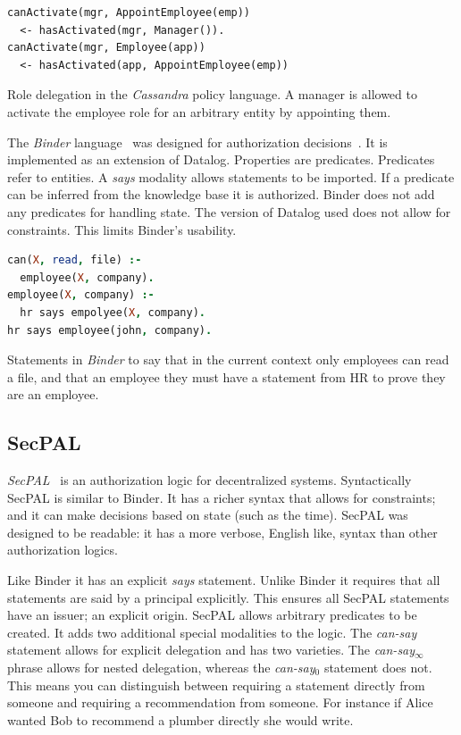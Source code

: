 \documentclass[a4paper,sfsidenotes]{%
  article%
}
\begin{document}
\begin{marginfigure}
  \begin{lstlisting}[language=Cassandra]
canActivate(mgr, AppointEmployee(emp))
  <- hasActivated(mgr, Manager()).
canActivate(mgr, Employee(app))
  <- hasActivated(app, AppointEmployee(emp))
  \end{lstlisting}
  \caption{Role delegation in the \emph{Cassandra} policy language. A manager is
  allowed to activate the employee role for an arbitrary entity by appointing
  them.}
\label{code:cassandra}
\end{marginfigure}

The \emph{Binder} language~\cite{DeTreville:2002ff} was designed for
authorization decisions~\cite{Abadi:2003kt}.  It is implemented as an extension
of Datalog.  Properties are predicates. Predicates refer to entities.  A
\emph{says} modality allows statements to be imported.  If a predicate can be
inferred from the knowledge base it is authorized.  Binder does not add any
predicates for handling state.  The version of Datalog used does not allow for
constraints.  This limits Binder's usability.

\begin{marginfigure}
  \begin{lstlisting}[language=Prolog,morekeywords={*,says,:-}]
can(X, read, file) :- 
  employee(X, company).
employee(X, company) :- 
  hr says empolyee(X, company).
hr says employee(john, company).
  \end{lstlisting}
  \caption{Statements in \emph{Binder} to say that in the current context only
    employees can read a file, and that an employee they must have a statement
    from HR to prove they are an employee.}
\label{code:binder}
\end{marginfigure}


\subsection{SecPAL}

\emph{{SecPAL}}~\cite{Becker:2006vh} is an authorization logic for decentralized
systems. Syntactically {SecPAL} is similar to Binder. It has a richer syntax
that allows for constraints; and it can make decisions based on state (such as the
time). {SecPAL} was designed to be readable: it has a more verbose, English like,
syntax than other authorization logics.

Like Binder it has an explicit \emph{says} statement. Unlike Binder it requires
that all statements are said by a principal explicitly. This ensures all SecPAL
statements have an issuer; an explicit origin. {SecPAL} allows arbitrary
predicates to be created. It adds two additional special modalities to the
logic. The \emph{can-say} statement allows for explicit delegation and has two
varieties.  The \emph{can-say$_\infty$} phrase allows for nested delegation,
whereas the \emph{can-say$_0$} statement does not.  This means you can
distinguish between requiring a statement directly from someone and requiring a
recommendation from someone.  For instance if Alice wanted Bob to recommend a
plumber directly she would write.
\end{document}
